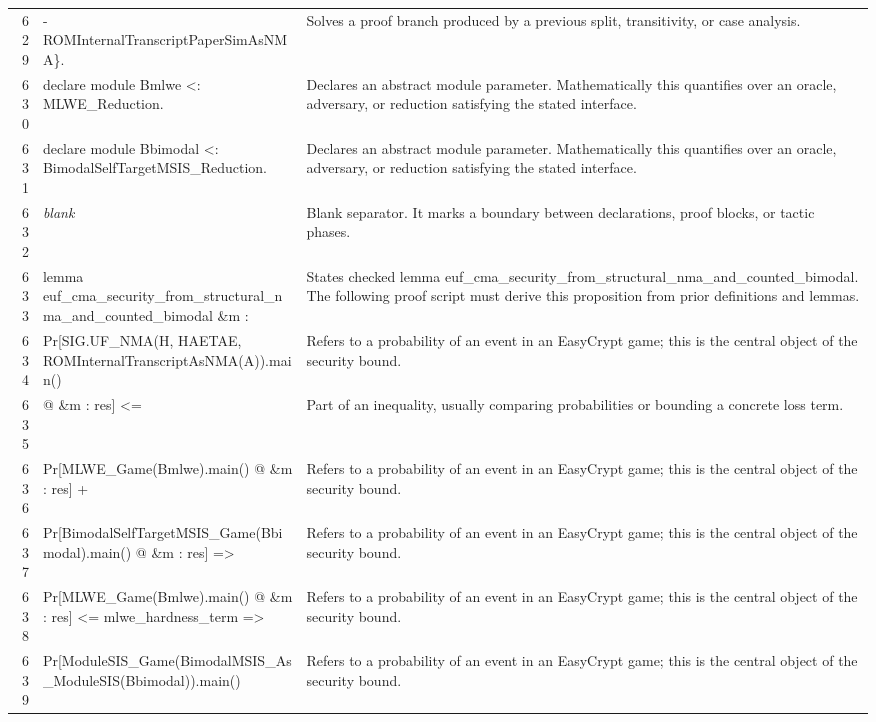 \documentclass[10pt]{article}
\begin{document}
\begin{longtable}{r L{0.53\textwidth} L{0.37\textwidth}}
629 & {\ttfamily\scriptsize                                                -ROMInternalTranscriptPaperSimAsNMA\}.} & Solves a proof branch produced by a previous split, transitivity, or case analysis. \\
630 & {\ttfamily\scriptsize declare module Bmlwe <: MLWE\_Reduction.} & Declares an abstract module parameter.  Mathematically this quantifies over an oracle, adversary, or reduction satisfying the stated interface. \\
631 & {\ttfamily\scriptsize declare module Bbimodal <: BimodalSelfTargetMSIS\_Reduction.} & Declares an abstract module parameter.  Mathematically this quantifies over an oracle, adversary, or reduction satisfying the stated interface. \\
632 & {\ttfamily\scriptsize \emph{blank}} & Blank separator.  It marks a boundary between declarations, proof blocks, or tactic phases. \\
633 & {\ttfamily\scriptsize lemma euf\_cma\_security\_from\_structural\_nma\_and\_counted\_bimodal \&m :} & States checked lemma euf\_cma\_security\_from\_structural\_nma\_and\_counted\_bimodal.  The following proof script must derive this proposition from prior definitions and lemmas. \\
634 & {\ttfamily\scriptsize   Pr[SIG.UF\_NMA(H, HAETAE, ROMInternalTranscriptAsNMA(A)).main()} & Refers to a probability of an event in an EasyCrypt game; this is the central object of the security bound. \\
635 & {\ttfamily\scriptsize        @ \&m : res] <=} & Part of an inequality, usually comparing probabilities or bounding a concrete loss term. \\
636 & {\ttfamily\scriptsize     Pr[MLWE\_Game(Bmlwe).main() @ \&m : res] +} & Refers to a probability of an event in an EasyCrypt game; this is the central object of the security bound. \\
637 & {\ttfamily\scriptsize     Pr[BimodalSelfTargetMSIS\_Game(Bbimodal).main() @ \&m : res] =>} & Refers to a probability of an event in an EasyCrypt game; this is the central object of the security bound. \\
638 & {\ttfamily\scriptsize   Pr[MLWE\_Game(Bmlwe).main() @ \&m : res] <= mlwe\_hardness\_term =>} & Refers to a probability of an event in an EasyCrypt game; this is the central object of the security bound. \\
639 & {\ttfamily\scriptsize   Pr[ModuleSIS\_Game(BimodalMSIS\_As\_ModuleSIS(Bbimodal)).main()} & Refers to a probability of an event in an EasyCrypt game; this is the central object of the security bound. \\

\end{longtable}
\end{document}
